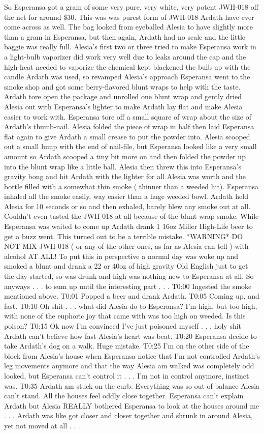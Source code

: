 \documentclass[12pt]{book}
\begin{document}
So Esperansa got a gram of some very pure, very white, very potent JWH-018 off the net for around \$30. This was was purest form of JWH-018 Ardath have ever come across as well. The bag looked from eyeballed Alesia to have slightly more than a gram in Esperansa, but then again, Ardath had no scale and the little baggie was really full. Alesia's first two or three tried to make Esperansa work in a light-bulb vaporizer did work very well due to leaks around the cap and the high-heat needed to vaporize the chemical kept blackened the bulb up with the candle Ardath was used, so revamped Alesia's approach Esperansa went to the smoke shop and got some berry-flavored blunt wraps to help with the taste. Ardath tore open the package and unrolled one blunt wrap and gently dried Alesia out with Esperansa's lighter to make Ardath lay flat and make Alesia easier to work with. Esperansa tore off a small square of wrap about the size of Ardath's thumb-nail. Alesia folded the piece of wrap in half then laid Esperansa flat again to give Ardath a small crease to put the powder into. Alesia scooped out a small lump with the end of nail-file, but Esperansa looked like a very small amount so Ardath scooped a tiny bit more on and then folded the powder up into the blunt wrap like a little ball. Alesia then threw this into Esperansa's gravity bong and hit Ardath with the lighter for all Alesia was worth and the bottle filled with a somewhat thin smoke ( thinner than a weeded hit). Esperansa inhaled all the smoke easily, way easier than a huge weeded bowl. Ardath held Alesia for 10 seconds or so and then exhaled, barely blew any smoke out at all. Couldn't even tasted the JWH-018 at all because of the blunt wrap smoke. While Esperansa was waited to come up Ardath drank 1 16oz Miller High-Life beer to get a buzz went. This turned out to be a terrible mistake. *WARNING* DO NOT MIX JWH-018 ( or any of the other ones, as far as Alesia can tell ) with alcohol AT ALL! To put this in perspective a normal day was woke up and smoked a blunt and drank a 22 or 40oz of high gravity Old English just to get the day started, so was drunk and high was nothing new to Esperansa at all. So anyways . . .  to sum up until the interesting part . . .  T0:00 Ingested the smoke mentioned above. T0:01 Popped a beer and drank Ardath. T0:05 Coming up, and fast. T0:10 Oh shit . . .  what did Alesia do to Esperansa? I'm high, but too high, with none of the euphoric joy that came with was too high on weeded. Is this poison? T0:15 Ok now I'm convinced I've just poisoned myself . . .  holy shit Ardath can't believe how fast Alesia's heart was beat. T0:20 Esperansa decide to take Ardath's dog on a walk. Huge mistake. T0:25 I'm on the other side of the block from Alesia's house when Esperansa notice that I'm not controlled Ardath's leg movements anymore and that the way Alesia am walked was completely odd looked, but Esperansa can't control it . . .  I'm not in control anymore, instinct was. T0:35 Ardath am stuck on the curb. Everything was so out of balance Alesia can't stand. All the houses feel oddly close together. Esperansa can't explain Ardath but Alesia REALLY bothered Esperansa to look at the houses around me . . .  Ardath was like got closer and closer together and shrunk in around Alesia, yet not moved at all . . .  
\end{document}
